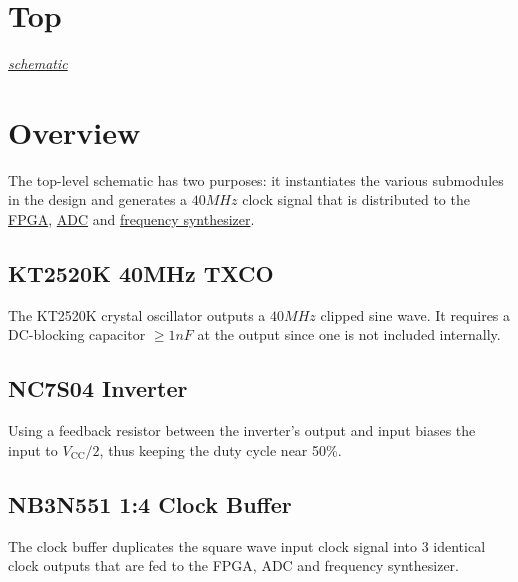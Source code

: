 \section{Top}
\label{sec:top}
\textit{\hyperlink{schematic.1}{schematic}}

\section{Overview}
\label{sec:top-overview}

The top-level schematic has two purposes: it instantiates the various submodules in the design and
generates a $40 \si{MHz}$ clock signal that is distributed to the
\hyperref[sec:xc7a15t-ftg256]{FPGA}, \hyperref[sec:ltc2292]{ADC} and
\hyperref[sec:adf4158]{frequency synthesizer}.

\subsection{KT2520K 40MHz TXCO}
\label{sec:kt2520k}

The KT2520K crystal oscillator outputs a $40 \si{MHz}$ clipped sine wave. It requires a DC-blocking
capacitor $\geq 1 \si{nF}$ at the output since one is not included internally.

\subsection{NC7S04 Inverter}
\label{sec:nc7s04}

Using a feedback resistor between the inverter's output and input biases the input to
$V_{\text{CC}}/2$, thus keeping the duty cycle near 50\%.

\subsection{NB3N551 1:4 Clock Buffer}
\label{sec:nb3n551}

The clock buffer duplicates the square wave input clock signal into 3 identical clock outputs that
are fed to the FPGA, ADC and frequency synthesizer.

